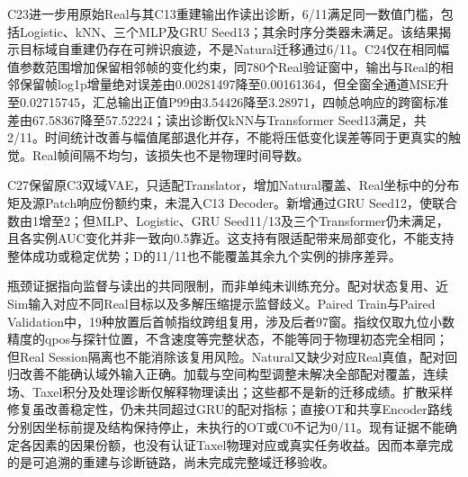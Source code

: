 C23进一步用原始Real与其C13重建输出作读出诊断，6/11满足同一数值门槛，包括Logistic、kNN、三个MLP及GRU Seed13；其余时序分类器未满足。该结果揭示目标域自重建仍存在可辨识痕迹，不是Natural迁移通过6/11。C24仅在相同幅值参数范围增加保留相邻帧的变化约束，同780个Real验证窗中，输出与Real的相邻保留帧log1p增量绝对误差由0.00281497降至0.00161364，但全窗全通道MSE升至0.02715745，汇总输出正值P99由3.54426降至3.28971，四帧总响应的跨窗标准差由67.58367降至57.52224；读出诊断仅kNN与Transformer Seed13满足，共2/11。时间统计改善与幅值尾部退化并存，不能将压低变化误差等同于更真实的触觉。Real帧间隔不均匀，该损失也不是物理时间导数。

C27保留原C3双域VAE，只适配Translator，增加Natural覆盖、Real坐标中的分布矩及源Patch响应份额约束，未混入C13 Decoder。新增通过GRU Seed12，使联合数由1增至2；但MLP、Logistic、GRU Seed11/13及三个Transformer仍未满足，且各实例AUC变化并非一致向0.5靠近。这支持有限适配带来局部变化，不能支持整体成功或稳定优势；D的11/11也不能覆盖其余九个实例的排序差异。

瓶颈证据指向监督与读出的共同限制，而非单纯未训练充分。配对状态复用、近Sim输入对应不同Real目标以及多解压缩提示监督歧义。Paired Train与Paired Validation中，19种放置后首帧指纹跨组复用，涉及后者97窗。指纹仅取九位小数精度的qpos与探针位置，不含速度等完整状态，不能等同于物理初态完全相同；但Real Session隔离也不能消除该复用风险。Natural又缺少对应Real真值，配对回归改善不能确认域外输入正确。加载与空间构型调整未解决全部配对覆盖，连续场、Taxel积分及处理诊断仅解释物理读出；这些都不是新的迁移成绩。扩散采样修复虽改善稳定性，仍未共同超过GRU的配对指标；直接OT和共享Encoder路线分别因坐标前提及结构保持停止，未执行的OT或C0不记为0/11。现有证据不能确定各因素的因果份额，也没有认证Taxel物理对应或真实任务收益。因而本章完成的是可追溯的重建与诊断链路，尚未完成完整域迁移验收。
